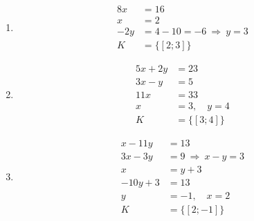 \documentclass[11pt,a4paper]{article}
\begin{document}
\begin{zadaniReseniBox}[title={Domácí úkol}]
\begin{enumerate}[label=\alph*)]
\[\]
\item
\[
\begin{aligned}
8x&=16\\x&=2\\-2y&=4-10=-6\ \Rightarrow\ y=3 \\[2mm]
K &= \{[2;3]\}
\end{aligned}
\]
\item
\[
\begin{aligned}
5x+2y&=23\\3x-y&=5\\11x&=33\\x&=3,\quad y=4 \\[2mm]
K &= \{[3;4]\}
\end{aligned}
\]
\item
\[
\begin{aligned}
x-11y&=13\\3x-3y&=9\ \Rightarrow\ x-y=3\\x&=y+3\\-10y+3&=13\\y&=-1,\quad x=2 \\[2mm]
K &= \{[2;-1]\}
\end{aligned}
\]
\end{enumerate}
\end{zadaniReseniBox}
\end{document}
